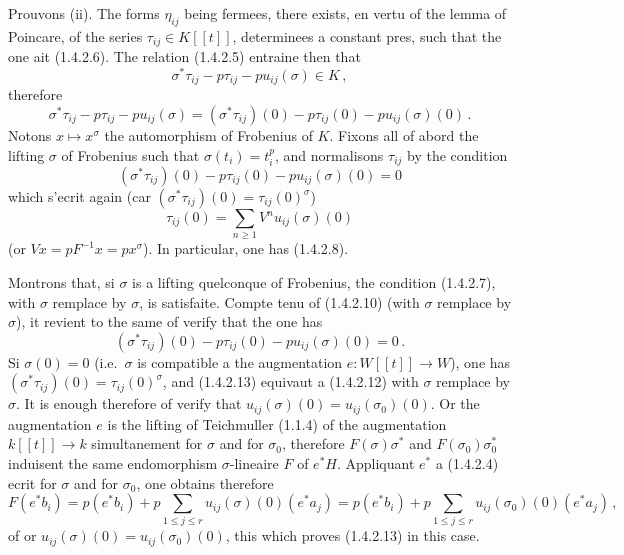 \documentclass[12pt,a4paper]{article}
\theoremstyle{plain}
\theoremstyle{definition}
\theoremstyle{remark}
\begin{document}
Prouvons (ii). The forms $\eta_{ij}$ being fermees, there exists, en vertu of the lemma of Poincare, of the series $\tau_{ij} \in K[[t]]$, determinees a constant pres, such that the one ait (1.4.2.6). The relation (1.4.2.5) entraine then that
\[
\sigma^*\tau_{ij} - p\tau_{ij} - pu_{ij}(\sigma) \in K\,,
\]
therefore
\begin{equation}\label{eq:1.4.2.10}
\sigma^*\tau_{ij} - p\tau_{ij} - pu_{ij}(\sigma) = (\sigma^*\tau_{ij})(0) - p\tau_{ij}(0) - pu_{ij}(\sigma)(0)\,.\end{equation}
Notons $x \mapsto x^\sigma$ the automorphism of Frobenius of $K$. Fixons all of abord the lifting $\sigma$ of Frobenius such that $\sigma(t_i) = t_i^p$, and normalisons $\tau_{ij}$ by the condition
\begin{equation}\label{eq:1.4.2.11}
(\sigma^*\tau_{ij})(0) - p\tau_{ij}(0) - pu_{ij}(\sigma)(0) = 0\end{equation}
which s'ecrit again (car $(\sigma^*\tau_{ij})(0) = \tau_{ij}(0)^\sigma$)
\begin{equation}\label{eq:1.4.2.12}
\tau_{ij}(0) = \sum_{n \geq 1} V^nu_{ij}(\sigma)(0)\end{equation}
(or $Vx = pF^{-1}x = px^\sigma$). In particular, one has (1.4.2.8).

Montrons that, si $\sigma$ is a lifting quelconque of Frobenius, the condition (1.4.2.7), with $\sigma$ remplace by $\sigma$, is satisfaite. Compte tenu of (1.4.2.10) (with $\sigma$ remplace by $\sigma$), it revient to the same of verify that the one has
\begin{equation}\label{eq:1.4.2.13}
(\sigma^*\tau_{ij})(0) - p\tau_{ij}(0) - pu_{ij}(\sigma)(0) = 0\,.\end{equation}
Si $\sigma(0) = 0$ (i.e.\ $\sigma$ is compatible a the augmentation $e : W[[t]] \to W$), one has $(\sigma^*\tau_{ij})(0) = \tau_{ij}(0)^\sigma$, and (1.4.2.13) equivaut a (1.4.2.12) with $\sigma$ remplace by $\sigma$. It is enough therefore of verify that $u_{ij}(\sigma)(0) = u_{ij}(\sigma_0)(0)$. Or the augmentation $e$ is the lifting of Teichmuller (1.1.4) of the augmentation $k[[t]] \to k$ simultanement for $\sigma$ and for $\sigma_0$, therefore $F(\sigma)\sigma^*$ and $F(\sigma_0)\sigma_0^*$ induisent the same endomorphism $\sigma$-lineaire $F$ of $e^*H$. Appliquant $e^*$ a (1.4.2.4) ecrit for $\sigma$ and for $\sigma_0$, one obtains therefore
\[
F(e^*b_i) = p(e^*b_i) + p\sum_{1 \leq j \leq r} u_{ij}(\sigma)(0)(e^*a_j) = p(e^*b_i) + p\sum_{1 \leq j \leq r} u_{ij}(\sigma_0)(0)(e^*a_j)\,,
\]
of or $u_{ij}(\sigma)(0) = u_{ij}(\sigma_0)(0)$, this which proves (1.4.2.13) in this case.
\end{document}
